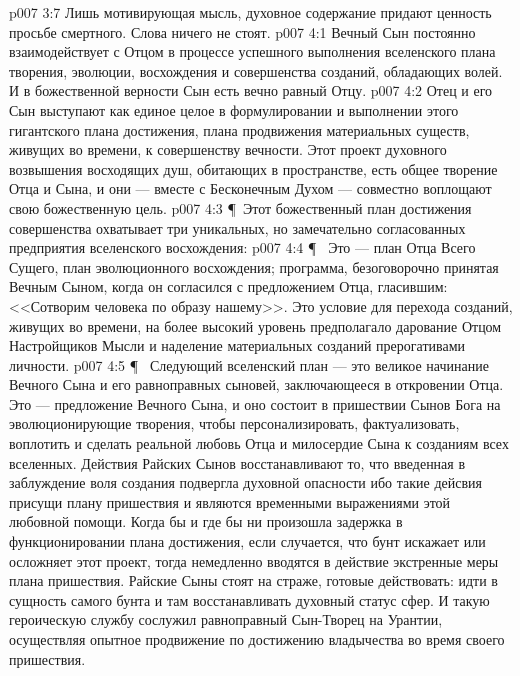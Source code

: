 \vs p007 3:7 Лишь мотивирующая мысль, духовное содержание придают ценность просьбе смертного. Слова ничего не стоят.
\vs p007 4:1 Вечный Сын постоянно взаимодействует с Отцом в процессе успешного выполнения  вселенского плана творения, эволюции, восхождения и совершенства созданий, обладающих волей. И в божественной верности Сын есть вечно равный Отцу.
\vs p007 4:2 Отец и его Сын выступают как единое целое в формулировании и выполнении этого гигантского плана достижения, плана продвижения материальных существ, живущих во времени, к совершенству вечности. Этот проект духовного возвышения восходящих душ, обитающих в пространстве, есть общее творение Отца и Сына, и они --- вместе с Бесконечным Духом --- совместно воплощают свою божественную цель.
\vs p007 4:3 \P\ Этот божественный план достижения совершенства охватывает три уникальных, но замечательно согласованных предприятия вселенского восхождения:
\vs p007 4:4 \P\ \bibnobreakspace {} Это --- план Отца Всего Сущего, план эволюционного восхождения; программа, безоговорочно принятая Вечным Сыном, когда он согласился с предложением Отца, гласившим: <<Сотворим человека по образу нашему>>. Это условие для перехода созданий, живущих во времени, на более высокий уровень предполагало дарование Отцом Настройщиков Мысли и наделение материальных созданий прерогативами личности.
\vs p007 4:5 \P\ \bibnobreakspace {} Следующий вселенский план --- это великое начинание Вечного Сына и его равноправных сыновей, заключающееся в откровении Отца. Это --- предложение Вечного Сына, и оно состоит в пришествии Сынов Бога на эволюционирующие творения, чтобы персонализировать, фактуализовать, воплотить и сделать реальной любовь Отца и милосердие Сына к созданиям всех вселенных. Действия Райских Сынов восстанавливают то, что введенная в заблуждение воля создания подвергла духовной опасности ибо такие дейсвия присущи плану пришествия и являются временными выражениями этой любовной помощи. Когда бы и где бы ни произошла задержка в функционировании плана достижения, если случается, что бунт искажает или осложняет этот проект, тогда немедленно вводятся в действие экстренные меры плана пришествия. Райские Сыны стоят на страже, готовые действовать: идти в сущность самого бунта и там восстанавливать духовный статус сфер. И такую героическую службу сослужил равноправный Сын\hyp{}Творец на Урантии, осуществляя опытное продвижение по достижению владычества во время своего пришествия.
